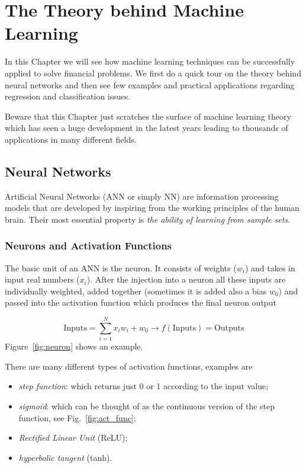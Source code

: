 \chapter{The Theory behind Machine Learning}
\label{ch:neural-network}

In this Chapter we will see how machine learning techniques can be successfully applied to solve financial problems. We first do a quick tour on the theory behind neural networks and then see few examples and practical applications regarding regression and classification issues.

Beware that this Chapter just scratches the surface of machine learning theory which has seen a huge development in the latest years leading to thousands of applications in many different fields.
    
\section{Neural Networks}\label{neural-networks}

Artificial Neural Networks (ANN or simply NN) are information processing models that are developed by inspiring from the working principles of the human brain. Their most essential property is \emph{the ability of learning from sample sets}.

\subsection{Neurons and Activation Functions}
The basic unit of an ANN is the neuron.
It consists of weights (\(w_i\)) and takes in input real numbers (\(x_i\)). After the injection into a neuron all these inputs are individually weighted, added together (sometimes it is added also a bias \(w_0\)) and passed into the activation function which produces the final neuron output

\[ \textrm{Inputs} = \sum_{i=1}^{N} x_i w_i + w_0 \rightarrow f(\textrm{Inputs}) = \textrm{Outputs}\]
Figure~\ref{fig:neuron} shows an example.

There are many different types of activation functions, examples are
\begin{itemize}
\item \emph{step function}: which returns just 0 or 1 according to the input value;
\item \emph{sigmoid}: which can be thought of as the continuous version of the step function, see Fig.~\ref{fig:act_func};
\item \emph{Rectified Linear Unit} (ReLU);
\item \emph{hyperbolic tangent} (tanh).
\end{itemize}

